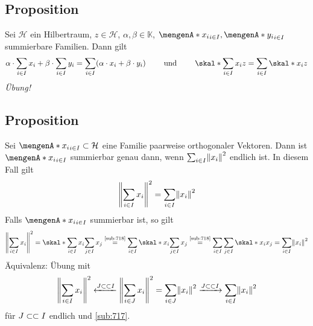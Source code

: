 \subsection[Proposition: Linearität von unendlichen Summen und Verträglichkeit Skalarprodukt]{Proposition} %
\label{sub:718}
Sei $\mathcal{H}$ ein Hilbertraum, $z \in \mathcal{H}$, $\alpha, \beta \in \mathds{K}$, $\set{x_i}_{i \in I}, \set{y_i}_{i \in I}$ summierbare Familien. Dann gilt
\begin{align*}
	\alpha \cdot \sum_{i \in I} x_i + \beta \cdot \sum_{i \in I} y_i = \sum_{i \in I} \enbrace*{\alpha \cdot x_i + \beta \cdot y_i} 
	\qquad \text{ und } \qquad 
	\skal*{\sum_{i \in I} x_i}{z} = \sum_{i \in I} \skal*{x_i}{z}
\end{align*}
\emph{Übung!} \bewende

\subsection[Proposition: Kriterium für die Summierbarkeit orthogonaler Vektoren]{Proposition} %
\label{sub:719}
Sei $\set{x_i}_{i \in I}\subset \mathcal{H}$ eine Familie paarweise orthogonaler Vektoren. Dann ist $\set{x_i}_{i \in I}$ summierbar genau dann, wenn 
$\sum_{i \in I} \norm{x_i}^2$ endlich ist. In diesem Fall gilt
\[
	\norm{\sum_{i \in I}x_i}^2 = \sum_{i \in I} \norm{x_i}^2  
\]
Falls $\set{x_i}_{i \in I}$ summierbar ist, so gilt
\begin{align*}
	\norm{\sum_{i \in I} x_i}^2 =  
	\skal*{\sum_{i \in I}x_i}{\sum_{j \in I} x_j} \stackrel{\mbox{\scriptsize\ref{sub:718}}}{=} \sum_{i \in I} \skal*{x_i}{\sum_{j \in I} x_j}
	\stackrel{\mbox{\scriptsize\ref{sub:718}}}{=} \sum_{i \in I} \sum_{j \in I} \skal*{x_i}{x_j} = \sum_{i \in I} \norm{x_i}^2  
\end{align*}
Äquivalenz: Übung mit 
\[
	\norm{\sum_{i \in I}x_i}^2 \xleftarrow{J \finSub I}\norm{\sum_{i \in J} x_i}^2 = \sum_{i \in J} \norm{x_i}^2 \xrightarrow{J \finSub I} \sum_{i \in I} \norm{x_i}^2  
\]
für $J \subset\mkern-0.7mu \subset I$ endlich und \ref{sub:717}. \bewende

